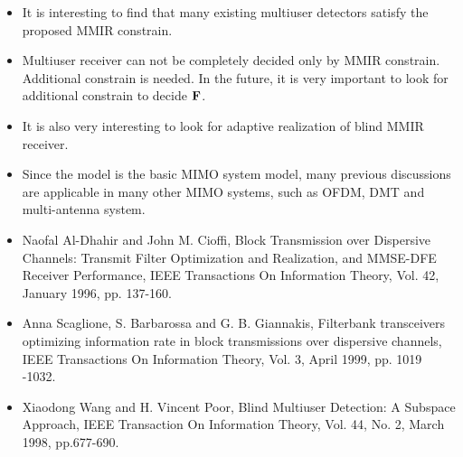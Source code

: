 \documentclass[20pt,landscape]{foils}
\newcommand{\bF}{{\bf F}}
\begin{document}
\begin{itemize}
\item It is interesting to find that many existing multiuser
detectors satisfy the proposed MMIR constrain.

\item Multiuser receiver can not be completely decided only by
MMIR constrain. Additional constrain is needed. In the future, it
is very important to look for additional constrain to decide
$\bF$.

\item It is also very interesting to look for adaptive realization
of blind MMIR receiver.

\item Since the model is the basic MIMO system model, many
previous discussions are applicable in many other MIMO systems,
such as OFDM, DMT and multi-antenna system.
\end{itemize}



\begin{itemize}
\item \small Naofal Al-Dhahir and John M. Cioffi, Block
Transmission over Dispersive Channels: Transmit Filter
Optimization and Realization, and MMSE-DFE Receiver Performance,
IEEE Transactions On Information Theory, Vol. 42, January 1996,
pp. 137-160.

\item Anna Scaglione, S. Barbarossa and G. B. Giannakis,
Filterbank transceivers optimizing information rate in block
transmissions over dispersive channels, IEEE Transactions On
Information Theory, Vol. 3, April 1999, pp. 1019 -1032.

\item Xiaodong Wang and H. Vincent Poor, Blind Multiuser
Detection: A Subspace Approach, IEEE Transaction On Information
Theory, Vol. 44, No. 2, March 1998, pp.677-690.
\end{itemize}
\end{document}
